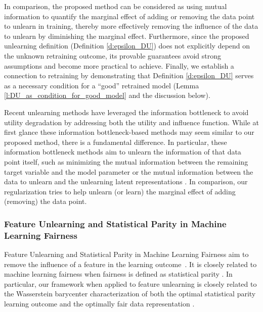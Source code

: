 In comparison, the proposed method can be considered as using mutual information to quantify the marginal effect of adding or removing the data point to unlearn in training, thereby more effectively removing the influence of the data to unlearn by diminishing the marginal effect. Furthermore, since the proposed unlearning definition (Definition \ref{d:epsilon_DU}) does not explicitly depend on the unknown retraining outcome, its provable guarantees avoid strong assumptions and become more practical to achieve. Finally, we establish a connection to retraining by demonstrating that Definition \ref{d:epsilon_DU} serves as a necessary condition for a “good” retrained model (Lemma \ref{l:DU_as_condition_for_good_model} and the discussion below).

Recent unlearning methods have leveraged the information bottleneck \cite{li2021unlearning, han2024unlearning} to avoid utility degradation by addressing both the utility and influence function. While at first glance these information bottleneck-based methods may seem similar to our proposed method, there is a fundamental difference. In particular, these information bottleneck methods aim to unlearn the information of that data point itself, such as minimizing the mutual information between the remaining target variable and the model parameter \cite{han2024unlearning} or the mutual information between the data to unlearn and the unlearning latent representations \cite{li2021unlearning}. In comparison, our regularization tries to help unlearn (or learn) the marginal effect of adding (removing) the data point.

\subsubsection{Feature Unlearning and Statistical Parity in Machine Learning Fairness}

Feature Unlearning and Statistical Parity in Machine Learning Fairness aim to remove the influence of a feature in the learning outcome~\cite{warnecke2021machine, han2024unlearning}. It is closely related to machine learning fairness when fairness is defined as statistical parity \cite{dwork2012fairness}. In particular, our framework when applied to feature unlearning is closely related to the Wasserstein barycenter characterization of both the optimal statistical parity learning outcome \cite{chzhen2020fair, gouic2020projection} and the optimally fair data representation \cite{xu2023fair}.

